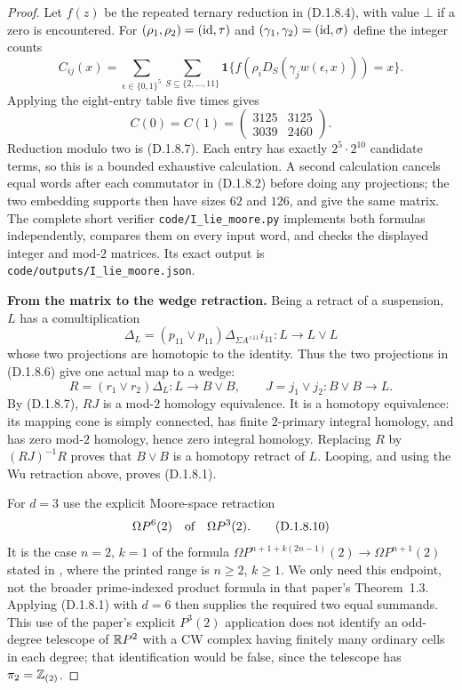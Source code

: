 \begin{proof}
Let $f(z)$ be the repeated ternary reduction in (D.1.8.4), with
value $\bot$ if a zero is encountered. For
$(\rho_1,\rho_2)=(\mathrm{id},\tau)$ and
$(\gamma_1,\gamma_2)=(\mathrm{id},\sigma)$ define the integer counts
\[
 C_{ij}(x)=
 \sum_{\epsilon\in\{0,1\}^5}
 \sum_{S\subseteq\{2,\ldots,11\}}
  \mathbf1\{f(\rho_iD_S(\gamma_jw(\epsilon,x)))=x\}.
\]
Applying the eight-entry table five times gives
\[
             C(0)=C(1)=
                  \begin{pmatrix}3125&3125\\3039&2460\end{pmatrix}.
 \tag{D.1.8.9}
\]
Reduction modulo two is (D.1.8.7). Each entry has exactly
$2^5\cdot2^{10}$ candidate terms, so this is a bounded exhaustive
calculation. A second calculation cancels equal words after
each commutator in (D.1.8.2) before doing any projections; the
two embedding supports then have sizes $62$ and $126$, and
give the same matrix. The complete short verifier
\texttt{code/I\_lie\_moore.py} implements both formulas
independently, compares them on every input word, and checks
the displayed integer and mod-$2$ matrices. Its exact output
is \texttt{code/outputs/I\_lie\_moore.json}.

\medskip\noindent
\textbf{From the matrix to the wedge retraction.}
Being a retract of a suspension, $L$ has a comultiplication
\[
 \Delta_L=(p_{11}\vee p_{11})
                \Delta_{\Sigma A^{\wedge11}}i_{11}:L\to L\vee L
\]
whose two projections are homotopic to the identity. Thus the
two projections in (D.1.8.6) give one actual map to a wedge:
\[
 R=(r_1\vee r_2)\Delta_L:L\longrightarrow B\vee B,
 \qquad J=j_1\vee j_2:B\vee B\longrightarrow L.
\]
By (D.1.8.7), $RJ$ is a mod-$2$ homology equivalence. It is a
homotopy equivalence: its mapping cone is simply connected,
has finite $2$-primary integral homology, and has zero mod-$2$
homology, hence zero integral homology. Replacing $R$ by
$(RJ)^{-1}R$ proves that $B\vee B$ is a homotopy retract of
$L$. Looping, and using the Wu retraction above, proves
(D.1.8.1).

For $d=3$ use the explicit Moore-space retraction
\[
                  \Omega P^6(2)\quad\hbox{of}\quad\Omega P^3(2).
 \tag{D.1.8.10}
\]
It is the case $n=2$, $k=1$ of the formula
$\Omega P^{n+1+k(2n-1)}(2)\to\Omega P^{n+1}(2)$ stated
in \cite[proof of Corollary~1.4, p.~3258]{I_ChenWu2013},
where the printed range is $n\geq2$, $k\geq1$.
We only need this endpoint, not the broader prime-indexed product
formula in that paper's Theorem~1.3. Applying (D.1.8.1) with
$d=6$ then supplies the required two equal summands. This use of
the paper's explicit $P^3(2)$ application does not identify an
odd-degree telescope of $\mathbb{R}P^2$ with a CW complex having finitely
many ordinary cells in each degree; that identification would
be false, since the telescope has $\pi_2=\mathbb Z_{(2)}$.


\end{proof}
